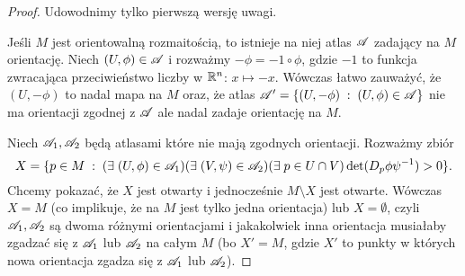 \begin{proof}%
%
%
%
%

  Udowodnimy tylko pierwszą wersję uwagi.

  Jeśli $M$ jest orientowalną rozmaitością, to istnieje na niej atlas $\mathcal{A}$ zadający na $M$ orientację. Niech $(U,\phi)\in\mathcal{A}$ i rozważmy $-\phi=-1\circ\phi$, gdzie $-1$ to funkcja zwracająca przeciwieństwo liczby w $\mathbb{R}^n$: $x\mapsto -x$. Wówczas łatwo zauważyć, że $(U,-\phi)$ to nadal mapa na $M$ oraz, że atlas $\mathcal{A}'=\{(U,-\phi)\;:\;(U,\phi)\in\mathcal{A}\}$ nie ma orientacji zgodnej z $\mathcal{A}$ ale nadal zadaje orientację na $M$.


  Niech $\mathcal{A}_1,\mathcal{A}_2$ będą atlasami które nie mają zgodnych orientacji. Rozważmy zbiór
  $$X=\{p\in M\;:\;(\exists\;(U,\phi)\in\mathcal{A}_1)(\exists\;(V,\psi)\in\mathcal{A}_2)(\exists\;p\in U\cap V)\det(D_p\phi\psi^{-1})>0\}.$$
  Chcemy pokazać, że $X$ jest otwarty i jednocześnie $M\setminus X$ jest otwarte. Wówczas $X=M$ (co implikuje, że na $M$ jest tylko jedna orientacja) lub $X=\emptyset$, czyli $\mathcal{A}_1,\mathcal{A}_2$ są dwoma różnymi orientacjami i jakakolwiek inna orientacja musiałaby zgadzać się z $\mathcal{A}_1$ lub $\mathcal{A}_2$ na całym $M$ (bo $X'=M$, gdzie $X'$ to punkty w których nowa orientacja zgadza się z $\mathcal{A}_1$ lub $\mathcal{A}_2$).


\end{proof}
